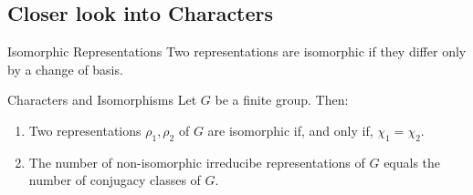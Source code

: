 
\subsection{Closer look into Characters}

\begin{defn}{Isomorphic Representations}{}
	Two representations are isomorphic if they differ only by a change of basis.
\end{defn}

\begin{thm}{Characters and Isomorphisms}{}
	Let \(G\) be a finite group. Then:
	\begin{enumerate}
		\item Two representations \(\rho_1, \rho_2\) of \(G\) are isomorphic if, and only if, \(\chi_1 = \chi_2\).
		\item The number of non-isomorphic irreducibe representations of \(G\) equals the number of conjugacy classes of \(G\).
	\end{enumerate}
\end{thm}
